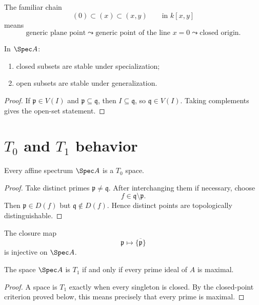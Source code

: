 The familiar chain
\[
(0)\subset (x)\subset (x,y)
\qquad\text{in }k[x,y]
\]
means
\[
\text{generic plane point}
\leadsto
\text{generic point of the line }x=0
\leadsto
\text{closed origin}.
\]

\begin{proposition}
In $\Spec A$:
\begin{enumerate}
\item closed subsets are stable under specialization;
\item open subsets are stable under generalization.
\end{enumerate}
\end{proposition}

\begin{proof}
If $\mathfrak p\in V(I)$ and $\mathfrak p\subseteq\mathfrak q$, then
$I\subseteq\mathfrak q$, so $\mathfrak q\in V(I)$.  Taking complements gives the open-set
statement.
\end{proof}



\section{\texorpdfstring{$T_0$}{T0} and \texorpdfstring{$T_1$}{T1} behavior}

\begin{proposition}
Every affine spectrum $\Spec A$ is a $T_0$ space.
\end{proposition}

\begin{proof}
Take distinct primes $\mathfrak p\neq\mathfrak q$.  After interchanging them if necessary,
choose
\[
f\in\mathfrak q\setminus\mathfrak p.
\]
Then $\mathfrak p\in D(f)$ but $\mathfrak q\notin D(f)$.  Hence distinct points are
topologically distinguishable.
\end{proof}

\begin{corollary}
The closure map
\[
\mathfrak p\longmapsto\overline{\{\mathfrak p\}}
\]
is injective on $\Spec A$.
\end{corollary}

\begin{proposition}
The space $\Spec A$ is $T_1$ if and only if every prime ideal of $A$ is maximal.
\end{proposition}

\begin{proof}
A space is $T_1$ exactly when every singleton is closed.  By the closed-point criterion
proved below, this means precisely that every prime is maximal.
\end{proof}

